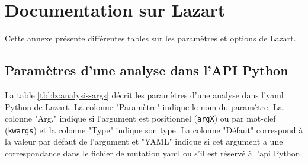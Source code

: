       
\chapter{Documentation sur Lazart}

    Cette annexe présente différentes tables sur les paramètres et options de Lazart.

    \section{Paramètres d'une analyse dans l'API Python}
    \label{annexe:lz:analysis-args}

        La table \ref{tbl:lz:analysis-args} décrit les paramètres d'une analyse dans l'\gls{yaml} Python de Lazart.
        La colonne "Paramètre" indique le nom du paramètre. La colonne "Arg." indique si l'argument est positionnel (\texttt{argX}) ou par mot-clef (\texttt{kwargs}) et la colonne "Type" indique son type.
        La colonne "Défaut" correspond à la valeur par défaut de l'argument et "YAML" indique si cet argument a une correspondance dans le fichier de mutation \gls{yaml} ou s'il est réservé à l'\gls{api} Python.
            
